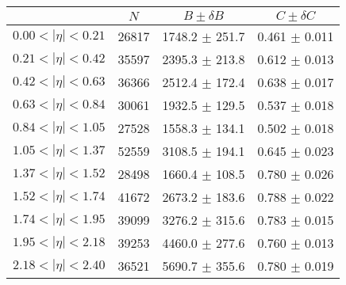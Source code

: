\begin{tabular}{lccc}
\hline
    &   $N$   & $B \pm \delta B$  &  $C \pm \delta C$ \\
\hline
$0.00 < |\eta| <0.21$          & 26817      & 1748.2     $\pm$ 251.7 & 0.461      $\pm$ 0.011 \\
$0.21 < |\eta| <0.42$          & 35597      & 2395.3     $\pm$ 213.8 & 0.612      $\pm$ 0.013 \\
$0.42 < |\eta| <0.63$          & 36366      & 2512.4     $\pm$ 172.4 & 0.638      $\pm$ 0.017 \\
$0.63 < |\eta| <0.84$          & 30061      & 1932.5     $\pm$ 129.5 & 0.537      $\pm$ 0.018 \\
$0.84 < |\eta| <1.05$          & 27528      & 1558.3     $\pm$ 134.1 & 0.502      $\pm$ 0.018 \\
$1.05 < |\eta| <1.37$          & 52559      & 3108.5     $\pm$ 194.1 & 0.645      $\pm$ 0.023 \\
$1.37 < |\eta| <1.52$          & 28498      & 1660.4     $\pm$ 108.5 & 0.780      $\pm$ 0.026 \\
$1.52 < |\eta| <1.74$          & 41672      & 2673.2     $\pm$ 183.6 & 0.788      $\pm$ 0.022 \\
$1.74 < |\eta| <1.95$          & 39099      & 3276.2     $\pm$ 315.6 & 0.783      $\pm$ 0.015 \\
$1.95 < |\eta| <2.18$          & 39253      & 4460.0     $\pm$ 277.6 & 0.760      $\pm$ 0.013 \\
$2.18 < |\eta| <2.40$          & 36521      & 5690.7     $\pm$ 355.6 & 0.780      $\pm$ 0.019 \\
\hline
\end{tabular}
